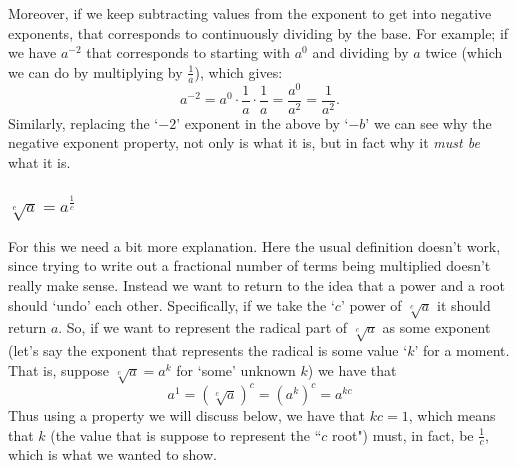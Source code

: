 \documentclass{ximera}
\begin{document}
        Moreover, if we keep subtracting values from the exponent to get into negative exponents, that corresponds to continuously dividing by the base. For example; if we have $a^{-2}$ that corresponds to starting with $a^0$ and dividing by $a$ twice (which we can do by multiplying by $\frac{1}{a}$), which gives:
        \[
            a^{-2} = a^0 \cdot \frac{1}{a} \cdot \frac{1}{a} = \frac{a^0}{a^2} = \frac{1}{a^2}.
        \]
        Similarly, replacing the `$-2$' exponent in the above by `$-b$' we can see why the negative exponent property, not only is what it is, but in fact why it \textit{must be} what it is.

    \subsubsection*{$\sqrt[c]{a} = a^{\frac{1}{c}}$}
    
        For this we need a bit more explanation. Here the usual definition doesn't work, since trying to write out a fractional number of terms being multiplied doesn't really make sense. Instead we want to return to the idea that a power and a root should `undo' each other. Specifically, if we take the `$c$' power of $\sqrt[c]{a}$ it should return $a$. So, if we want to represent the radical part of $\sqrt[c]{a}$ as some exponent (let's say the exponent that represents the radical is some value `$k$' for a moment. That is, suppose $\sqrt[c]{a} = a^k$ for `some' unknown $k$) we have that 
        \[
            a^1 = \left(\sqrt[c]{a}\right)^c = \left(a^k\right)^c = a^{kc}
        \]
        Thus using a property we will discuss below, we have that $kc = 1$, which means that $k$ (the value that is suppose to represent the ``$c$ root") must, in fact, be $\frac{1}{c}$, which is what we wanted to show.

\end{document}
